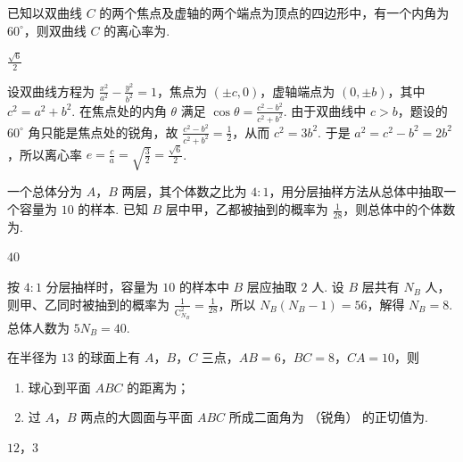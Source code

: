 \begin{problem}
已知以双曲线 \(C\) 的两个焦点及虚轴的两个端点为顶点的四边形中，有一个内角为 \( 60^{\circ} \)，则双曲线 \(C\) 的离心率为\fillinblank{}.
\end{problem}

\begin{answer}
\(\frac{\sqrt{6}}{2}\)
\end{answer}

\begin{solution}
设双曲线方程为 \(\frac{x^2}{a^2}-\frac{y^2}{b^2}=1\)，焦点为 \((\pm c,0)\)，虚轴端点为 \((0,\pm b)\)，其中 \(c^2=a^2+b^2\). 在焦点处的内角 \(\theta\) 满足 \(\cos\theta=\frac{c^2-b^2}{c^2+b^2}\). 由于双曲线中 \(c>b\)，题设的 \(60^\circ\) 角只能是焦点处的锐角，故 \(\frac{c^2-b^2}{c^2+b^2}=\frac12\)，从而 \(c^2=3b^2\). 于是 \(a^2=c^2-b^2=2b^2\)，所以离心率 \(e=\frac ca=\sqrt{\frac32}=\frac{\sqrt6}{2}\).
\end{solution}

\begin{problem}
一个总体分为 \(A\)，\(B\) 两层，其个体数之比为 \(4:1\)，用分层抽样方法从总体中抽取一个容量为 \(10\) 的样本. 已知 \(B\) 层中甲，乙都被抽到的概率为 \(\frac{1}{28}\)，则总体中的个体数为\fillinblank{}.
\end{problem}

\begin{answer}
\(40\)
\end{answer}

\begin{solution}
按 \(4:1\) 分层抽样时，容量为 \(10\) 的样本中 \(B\) 层应抽取 \(2\) 人. 设 \(B\) 层共有 \(N_B\) 人，则甲、乙同时被抽到的概率为 \(\frac{1}{\mathrm C_{N_B}^{2}}=\frac1{28}\)，所以 \(N_B(N_B-1)=56\)，解得 \(N_B=8\). 总体人数为 \(5N_B=40\).
\end{solution}

\begin{problem}
在半径为 \(13\) 的球面上有 \(A\)，\(B\)，\(C\) 三点，\(AB = 6\)，\(BC = 8\)，\(CA = 10\)，则
\begin{enumerate}
\item 球心到平面 \(ABC\) 的距离为\fillinblank{}；
\item 过 \(A\)，\(B\) 两点的大圆面与平面 \(ABC\) 所成二面角为 （锐角） 的正切值为\fillinblank{}.
\end{enumerate}
\end{problem}

\begin{answer}
\(12\)，\(3\)
\end{answer}

